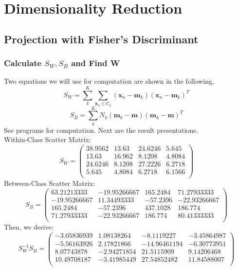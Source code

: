 \documentclass[11pt,a4paper]{article}
\newcommand{\htab}{\hspace*{0.63cm}}
\newcommand{\xnv}{\boldsymbol{x}_{n} }
\newcommand{\C}{\mathcal{C}}
\newcommand{\m}{\textbf{m}}
\begin{document}
\section{Dimensionality Reduction}
\subsection{Projection with Fisher's Discriminant}
\subsubsection{Calculate $S_{W},S_{B}$ and Find \textbf{W}}
\htab Two equations we will use for computation are shown in the following,
    \begin{equation}
        S_{W} = \sum_{k}^{K} \sum_{\xnv \in \C_{k}} (\xnv - \m_{k}) (\xnv - \m_{k})^{T}
    \end{equation}
    \begin{equation}
        S_{B} = \sum_{k}^{K} N_{k} (\m_{k} - \m) (\m_{k} - \m)^{T}
    \end{equation}
\htab See programs for computation. Next are the result presentations. \\
\htab Within-Class Scatter Matrix:\\
$$ S_{W} = \begin{pmatrix}   
    38.9562 &  13.63   &  24.6246  &  5.645  \\
    13.63   &  16.962  &   8.1208  &  4.8084 \\
    24.6246 &  8.1208  & 27.2226   & 6.2718 \\
    5.645   &  4.8084  &  6.2718   &  6.1566 \\ 
 \end{pmatrix} $$
\htab Between-Class Scatter Matrix:\\
$$ S_{B} = \begin{pmatrix}
    63.21213333  & -19.95266667  & 165.2484    &    71.27933333 \\
    -19.95266667  &  11.34493333  & -57.2396    &   -22.93266667 \\
    165.2484     &  -57.2396      & 437.1028    &   186.774      \\
    71.27933333  & -22.93266667 &  186.774     &    80.41333333 \\
    \end{pmatrix} $$
\htab Then, we derive: \\
$$ S_{W}^{-1} S_{B} = \begin{pmatrix}
    -3.05836939  &  1.08138264  & -8.1119227   & -3.45864987\\
    -5.56163926   & 2.17821866  & -14.96461194   & -6.30773951\\
    8.07743878   & -2.94271854  & 21.5115909   &  9.14206468\\
    10.49708187  & -3.41985449   & 27.54852482  & 11.84588007\\
    \end{pmatrix} $$
\end{document}
